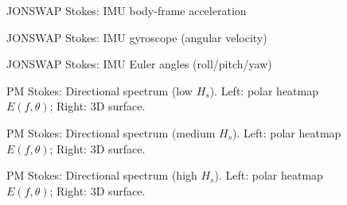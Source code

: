 \documentclass[11pt,letterpaper]{article}
\begin{document}
\begin{figure}[H]\centering
  \resizebox{\textwidth}{!}{}
  \caption{JONSWAP Stokes: IMU body-frame acceleration}
  \label{fig:jonswap_imu_acc}
\end{figure}
\clearpage

\begin{figure}[H]\centering
  \resizebox{\textwidth}{!}{}
  \caption{JONSWAP Stokes: IMU gyroscope (angular velocity)}
  \label{fig:jonswap_imu_gyro}
\end{figure}
\clearpage

\begin{figure}[H]\centering
  \resizebox{\textwidth}{!}{}
  \caption{JONSWAP Stokes: IMU Euler angles (roll/pitch/yaw)}
  \label{fig:jonswap_euler}
\end{figure}
\clearpage


\begin{figure}[H]\centering
  \begin{minipage}{0.49\textwidth}
    \resizebox{\linewidth}{!}{}
  \end{minipage}\hfill
  \begin{minipage}{0.49\textwidth}
    \resizebox{\linewidth}{!}{}
  \end{minipage}
  \caption{PM Stokes: Directional spectrum (low $H_s$). Left: polar heatmap $E(f,\theta)$; Right: 3D surface.}
  \label{fig:pmstokes_spec_low}
\end{figure}
\clearpage

\begin{figure}[H]\centering
  \begin{minipage}{0.49\textwidth}
    \resizebox{\linewidth}{!}{}
  \end{minipage}\hfill
  \begin{minipage}{0.49\textwidth}
    \resizebox{\linewidth}{!}{}
  \end{minipage}
  \caption{PM Stokes: Directional spectrum (medium $H_s$). Left: polar heatmap $E(f,\theta)$; Right: 3D surface.}
  \label{fig:pmstokes_spec_medium}
\end{figure}
\clearpage

\begin{figure}[H]\centering
  \begin{minipage}{0.49\textwidth}
    \resizebox{\linewidth}{!}{}
  \end{minipage}\hfill
  \begin{minipage}{0.49\textwidth}
    \resizebox{\linewidth}{!}{}
  \end{minipage}
  \caption{PM Stokes: Directional spectrum (high $H_s$). Left: polar heatmap $E(f,\theta)$; Right: 3D surface.}
  \label{fig:pmstokes_spec_high}
\end{figure}
\clearpage
\end{document}
